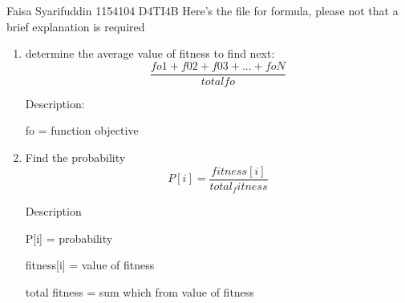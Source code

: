 Faisa Syarifuddin 1154104 D4TI4B
Here's the file for formula, please not that a brief explanation is required

\begin{enumerate}
    \item determine the average value of fitness to find next:
    \begin{equation}
        \frac{fo1 + f02 + f03 + ... + foN}{total fo}
    \end{equation}
    \par Description:
    \par fo = function objective

    \item Find the probability
    \begin{equation}
        P[i] = \frac{fitness[i]}{total_fitness}
    \end{equation}
    \par Description
    \par P[i] = probability
    \par fitness[i] = value of fitness
    \par total fitness = sum which from value of fitness 
\end{enumerate}